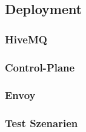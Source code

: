 \subsection{Deployment}
\subsubsection{HiveMQ}
\subsubsection{Control-Plane}
\subsubsection{Envoy}
\subsubsection{Test Szenarien}
\newpage

\begin{comment}
- Describe the realization of your concepts, in case you have actually developed some-thing.
- Elaborate on the software architecture of your tool, in case you have developed one. Use nested UML packages, components, and interfaces in a component diagram.
- If applicable, show the deploymentof your tool in a production environment. Use UML's deployment diagram notation.
- It must be clear from the architecture, what your thesis contributes and what it takes for granted like existing systems, code bases, libraries and frameworks. For example, you can decorate the components in a UML component diagram that you have implemented and those that you just used.
- Do not delve into ordinary details by, e.g., intensively describing a "p lain old Java-object (POJO)" in all its dreary getter-setter-details. Instead pick some interesting details and de-scribe them, e.g.,
  - if   you made extensive use of a certain design pattern, describe a single concrete appli-cation of it using, e.g., UML class diagrams or
  - if your work involves a complicated conversation pattern or protocol, explained it using a UML sequence diagram, state chart, activity diagram and the like or
  - if you have developed a central and canny algorithm, you may even show its implemen-tation in, e.g., Java code.
- Show how the result of your work actually looks like. In case of a tool, provide some screenshots together with some explanatory text.
- Describe the quantity of your work, e.g., in terms of lines of code or classes etc. Please just count your own hand-crafted code but not previously existing, imported or generated code.
- Describe the quality of your work, e.g., if you have developed a large web application, run some performance tests, depicts results and draw conclusions from them.
\end{comment}
